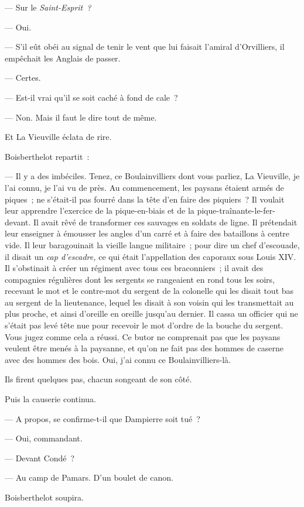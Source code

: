\documentclass[french,twoside]{book} %
\begin{document}
— Sur le \emph{Saint-Esprit ?}\par
— Oui.\par
— S’il eût obéi au signal de tenir le vent que lui faisait l’amiral d’Orvilliers, il empêchait les Anglais de passer.\par
— Certes.\par
— Est-il vrai qu’il se soit caché à fond de cale ?\par
— Non. Mais il faut le dire tout de même.\par
Et La Vieuville éclata de rire.\par
Boisberthelot repartit :\par
— Il y a des imbéciles. Tenez, ce Boulainvilliers dont vous parliez, La Vieuville, je l’ai connu, je l’ai vu de près. Au commencement, les paysans étaient armés de piques ; ne s’était-il pas fourré dans la tête d’en faire des piquiers ? Il voulait leur apprendre l’exercice de la pique-en-biais et de la pique-traînante-le-fer-devant. Il avait rêvé de transformer ces sauvages en soldats de ligne. Il prétendait leur enseigner à émousser les angles d’un carré et à faire des bataillons à centre vide. Il leur baragouinait la vieille langue militaire ;  pour dire un chef d’escouade, il disait un \emph{cap d’escadre,} ce qui était l’appellation des caporaux sous Louis XIV. Il s’obstinait à créer un régiment avec tous ces braconniers ; il avait des compagnies régulières dont les sergents se rangeaient en rond tous les soirs, recevant le mot et le contre-mot du sergent de la colonelle qui les disait tout bas au sergent de la lieutenance, lequel les disait à son voisin qui les transmettait au plus proche, et ainsi d’oreille en oreille jusqu’au dernier. Il cassa un officier qui ne s’était pas levé tête nue pour recevoir le mot d’ordre de la bouche du sergent. Vous jugez comme cela a réussi. Ce butor ne comprenait pas que les paysans veulent être menés à la paysanne, et qu’on ne fait pas des hommes de caserne avec des hommes des bois. Oui, j’ai connu ce Boulainvilliers-là.\par
Ils firent quelques pas, chacun songeant de son côté.\par
Puis la causerie continua.\par
— A propos, se confirme-t-il que Dampierre soit tué ?\par
— Oui, commandant.\par
— Devant Condé ?\par
— Au camp de Pamars. D’un boulet de canon.\par
Boisberthelot soupira.\par
\end{document}
